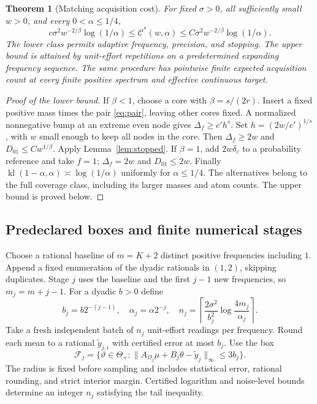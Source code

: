 \documentclass[10pt]{amsart}
\newtheorem{theorem}{Theorem}[section]
\theoremstyle{definition}
\theoremstyle{remark}
\newcommand{\ThetaAll}{\Theta_+}
\newcommand{\F}{\mathcal F}
\newcommand{\kl}{\operatorname{kl}}
\begin{document}
\begin{theorem}[Matching acquisition cost]\label{thm:cost}
For fixed $\sigma>0$, all sufficiently small $w>0$, and every $0<\alpha\le1/4$,
\begin{equation}\label{eq:cost}
 c\sigma^2w^{-2/\beta}\log(1/\alpha)
 \le\mathcal C^*(w,\alpha)
 \le C\sigma^2w^{-2/\beta}\log(1/\alpha).
\end{equation}
The lower class permits adaptive frequency, precision, and stopping. The upper bound is attained by unit-effort repetitions on a predetermined expanding frequency sequence. The same procedure has pointwise finite expected acquisition count at every finite positive spectrum and effective continuous target.
\end{theorem}
\begin{proof}[Proof of the lower bound]
If $\beta<1$, choose a core with $\beta=s/(2r)$. Insert a fixed positive mass times the pair \eqref{eq:pair}, leaving other cores fixed. A normalized nonnegative bump at an extreme even node gives $\Delta_f\ge c'h^s$. Set $h=(2w/c')^{1/s}$, with $w$ small enough to keep all nodes in the core. Then $\Delta_f\ge2w$ and $D_{01}\le Cw^{1/\beta}$. Apply Lemma~\ref{lem:stopped}. If $\beta=1$, add $2w\delta_c$ to a probability reference and take $f=1$; $\Delta_f=2w$ and $D_{01}\le2w$. Finally $\kl(1-\alpha,\alpha)\asymp\log(1/\alpha)$ uniformly for $\alpha\le1/4$. The alternatives belong to the full coverage class, including its larger masses and atom counts. The upper bound is proved below.
\end{proof}

\subsection{Predeclared boxes and finite numerical stages}
Choose a rational baseline of $m=K+2$ distinct positive frequencies including $1$. Append a fixed enumeration of the dyadic rationals in $(1,2)$, skipping duplicates. Stage $j$ uses the baseline and the first $j-1$ new frequencies, so $m_j=m+j-1$. For a dyadic $b>0$ define
\begin{equation}\label{eq:stages}
 b_j=b2^{-(j-1)},\quad \alpha_j=\alpha2^{-j},\quad
 n_j=\left\lceil\frac{2\sigma^2}{b_j^2}
                 \log\frac{4m_j}{\alpha_j}\right\rceil.
\end{equation}
Take a fresh independent batch of $n_j$ unit-effort readings per frequency. Round each mean to a rational $\widetilde y_{j,i}$ with certified error at most $b_j$. Use the box
\begin{equation}\label{eq:stagebox}
 \F_j=\{\vartheta\in\ThetaAll:
        \|A_{\Omega_j}\mu+B_j\theta-\widetilde y_j\|_\infty\le3b_j\}.
\end{equation}
The radius is fixed before sampling and includes statistical error, rational rounding, and strict interior margin. Certified logarithm and noise-level bounds determine an integer $n_j$ satisfying the tail inequality.
\end{document}
